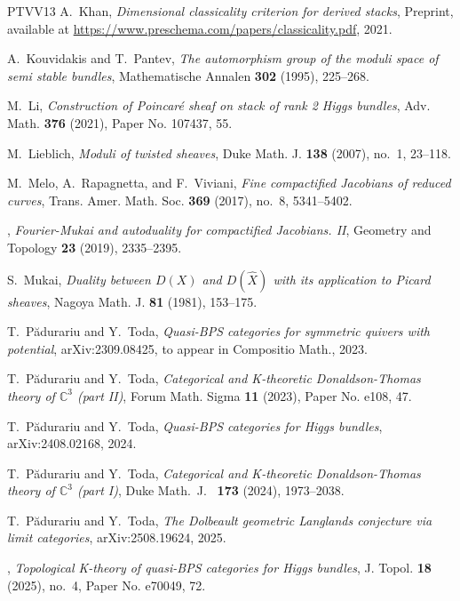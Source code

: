 \documentclass[11pt,oneside,a4paper,mathscr]{amsart}
\theoremstyle{definition}
\begin{document}
\begin{thebibliography}{PTVV13}
A.~Khan, \emph{Dimensional classicality criterion for derived stacks}, Preprint, available at \url{https://www.preschema.com/papers/classicality.pdf}, 2021.

A.~Kouvidakis and T.~Pantev, \emph{The automorphism group of the moduli space of semi stable bundles}, Mathematische Annalen \textbf{302} (1995), 225--268.

M.~Li, \emph{Construction of {P}oincar\'{e} sheaf on stack of rank 2 {H}iggs bundles}, Adv. Math. \textbf{376} (2021), Paper No. 107437, 55.

M.~Lieblich, \emph{Moduli of twisted sheaves}, Duke Math. J. \textbf{138} (2007), no.~1, 23--118.

M.~Melo, A.~Rapagnetta, and F.~Viviani, \emph{Fine compactified {J}acobians of reduced curves}, Trans. Amer. Math. Soc. \textbf{369} (2017), no.~8, 5341--5402.

\bysame, \emph{Fourier-{M}ukai and autoduality for compactified {J}acobians. {II}}, Geometry and Topology \textbf{23} (2019), 2335--2395.

S.~Mukai, \emph{Duality between {$D(X)$} and {$D(\widehat{X})$} with its application to {P}icard sheaves}, Nagoya Math. J. \textbf{81} (1981), 153--175.

T.~P{\u{a}}durariu and Y.~Toda, \emph{Quasi-{BPS} categories for symmetric quivers with potential}, arXiv:2309.08425, to appear in Compositio Math., 2023.

T.~P\u{a}durariu and Y.~Toda, \emph{Categorical and {K}-theoretic {D}onaldson-{T}homas theory of $\mathbb{C}^3$ (part {II})}, Forum Math. Sigma \textbf{11} (2023), Paper No. e108, 47.

T.~P{\u{a}}durariu and Y.~Toda, \emph{Quasi-{BPS} categories for {H}iggs bundles}, arXiv:2408.02168, 2024.

T.~P\u{a}durariu and Y.~Toda, \emph{Categorical and {K}-theoretic {D}onaldson-{T}homas theory of $\mathbb{C}^3$ (part {I})}, Duke Math.~J.~ \textbf{173} (2024), 1973--2038.

T.~P{\u{a}}durariu and Y.~Toda, \emph{The {D}olbeault geometric {L}anglands conjecture via limit categories}, arXiv:2508.19624, 2025.

\bysame, \emph{Topological {K}-theory of quasi-{BPS} categories for {H}iggs bundles}, J. Topol. \textbf{18} (2025), no.~4, Paper No. e70049, 72.


\end{thebibliography}
\end{document}
